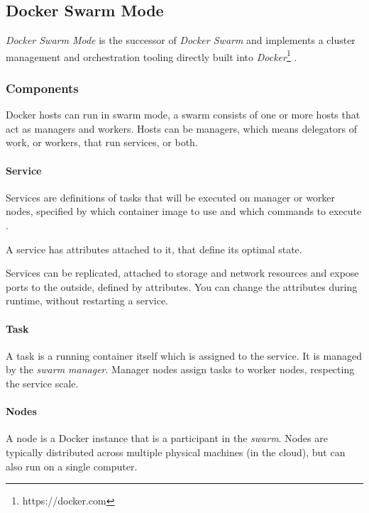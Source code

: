 \subsection{Docker Swarm Mode}\label{docker-swarm-mode}

\emph{Docker Swarm Mode} is the successor of \emph{Docker Swarm} and
implements a cluster management and orchestration tooling directly built
into \emph{Docker}\footnote{https://docker.com} .

\subsubsection{Components}\label{components}

Docker hosts can run in swarm mode, a swarm consists of one or more
hosts that act as managers and workers. Hosts can be managers, which
means delegators of work, or workers, that run services, or both.
\cite{dock-swarm}

\paragraph{Service}\label{service}

Services are definitions of tasks that will be executed on manager or
worker nodes, specified by which container image to use and which
commands to execute \cite{dock-swarm}.

A service has attributes attached to it, that define its optimal state.

Services can be replicated, attached to storage and network resources
and expose ports to the outside, defined by attributes. You can change
the attributes during runtime, without restarting a service.
\cite{dock-swarm}

\paragraph{Task}\label{task}

A task is a running container itself which is assigned to the service.
It is managed by the \emph{swarm manager}. Manager nodes assign tasks to
worker nodes, respecting the service scale.\cite{dock-swarm}

\paragraph{Nodes}\label{nodes}

A node is a Docker instance that is a participant in the \emph{swarm}.
Nodes are typically distributed across multiple physical machines (in
the cloud), but can also run on a single computer. \cite{dock-swarm}

